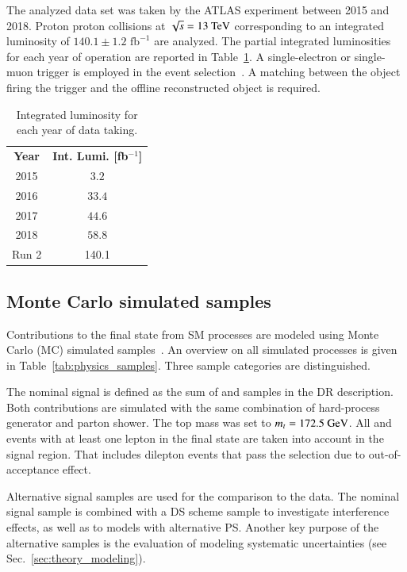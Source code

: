 The analyzed data set was taken by the ATLAS experiment between 2015 and 2018.
Proton proton collisions at $\sqrt{s}=13~\text{TeV}$ corresponding to an integrated luminosity
of $140.1\pm1.2 \text{ fb}^{-1}$ are analyzed.
The partial integrated luminosities for each year of operation are reported in Table~\ref{tab:Data:Lumi}.
A single-electron or single-muon trigger is employed in the event selection~\cite{TRIG-2018-05, TRIG-2018-01}.
A matching between the object firing the trigger and the offline reconstructed object is required.
\begin{table}[htbp]
    \centering
    \caption{Integrated luminosity for each year of data taking.}%
    \begin{tabular}{ c c }
      \hspace{1pt}\\
      \toprule
      \textbf{Year} & \textbf{Int. Lumi. [fb$^{-1}$]} \\
      \midrule
      2015  & $3.2$ \\
      2016  & $33.4$ \\
      2017  & $44.6$ \\
      2018  & $58.8$ \\
      \midrule
      Run 2 & 140.1\\
      \bottomrule
  \end{tabular}
  \label{tab:Data:Lumi}
\end{table}

\subsection{Monte Carlo simulated samples}%
\label{sec:datamc:mc}

Contributions to the \WbWb final state from SM processes are modeled using Monte Carlo (MC) simulated samples~\cite{SOFT-2010-01}. An overview on all simulated processes is given in 
Table~\ref{tab:physics_samples}.
Three sample categories are distinguished.

The nominal signal is defined as the sum of \ttbar and \tW samples in the DR description.
Both contributions are simulated with the same combination of hard-process generator and parton shower.
The top mass was set to $m_t = 172.5~\text{GeV}$.
All \ttbar and \tW events with at least one lepton in the final state are taken into account in the signal region. That includes dilepton events that pass the selection due to out-of-acceptance effect.

Alternative signal samples are used for the comparison to the data.
The nominal \ttbar signal sample is combined with a  DS scheme \tW sample to 
investigate interference effects, as well as to models with alternative PS.
Another key purpose of the alternative samples is the evaluation of modeling systematic uncertainties (see Sec.~\ref{sec:theory_modeling}).

